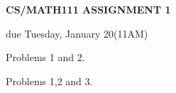 \documentclass{article}
\begin{document}
\centerline{\large \bf CS/MATH111 ASSIGNMENT 1}
\centerline{due Tuesday, January 20(11AM)}

\vskip 0.1in
 Problems 1 and 2.

 Problems 1,2 and 3.

\vskip 0.2in

\end{document}
